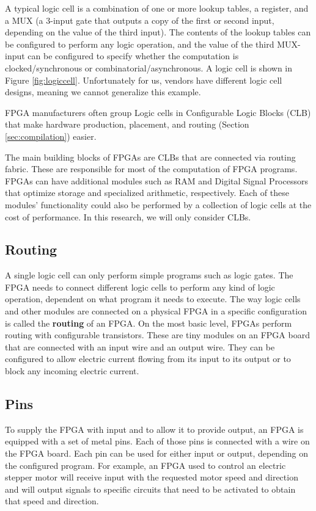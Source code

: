 A typical logic cell is a combination of one or more lookup tables, a register, and a MUX (a 3-input gate that outputs a copy of the first or second input, depending on the value of the third input).  The contents of the lookup tables can be configured to perform any logic operation, and the value of the third MUX-input can be configured to specify whether the computation is clocked/synchronous or combinatorial/asynchronous. A logic cell is shown in Figure \ref{fig:logiccell}. Unfortunately for us, vendors have different logic cell designs, meaning we cannot generalize this example.

FPGA manufacturers often group Logic cells in Configurable Logic Blocks (CLB) that make hardware production, placement, and routing (Section \ref{sec:compilation}) easier.
 
The main building blocks of FPGAs are CLBs that are connected via routing fabric. These are responsible for most of the computation of FPGA programs. FPGAs can have additional modules such as RAM and Digital Signal Processors that optimize storage and specialized arithmetic, respectively. Each of these modules' functionality could also be performed by a collection of logic cells at the cost of performance. In this research, we will only consider CLBs.

\subsection{Routing}
A single logic cell can only perform simple programs such as logic gates. The FPGA needs to connect different logic cells to perform any kind of logic operation, dependent on what program it needs to execute. The way logic cells and other modules are connected on a physical FPGA in a specific configuration is called the \textbf{routing} of an FPGA. On the most basic level, FPGAs perform routing with configurable transistors. These are tiny modules on an FPGA board that are connected with an input wire and an output wire. They can be configured to allow electric current flowing from its input to its output or to block any incoming electric current.

\subsection{Pins}
To supply the FPGA with input and to allow it to provide output, an FPGA is equipped with a set of metal pins. Each of those pins is connected with a wire on the FPGA board. Each pin can be used for either input or output, depending on the configured program. For example, an FPGA used to control an electric stepper motor will receive input with the requested motor speed and direction and will output signals to specific circuits that need to be activated to obtain that speed and direction.




